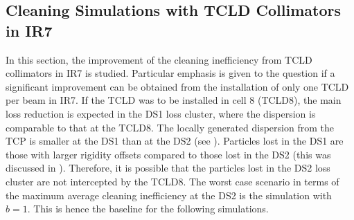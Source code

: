 





\subsection{Cleaning Simulations with TCLD Collimators in IR7}

In this section, the improvement of the cleaning inefficiency from TCLD collimators in IR7 is studied. Particular emphasis is given to the question if a significant improvement can be obtained from the installation of only one TCLD per beam in IR7. If the TCLD was to be installed in cell 8 (TCLD8), the main loss reduction is expected in the DS1 loss cluster, where the dispersion is comparable to that at the TCLD8. The locally generated dispersion from the TCP is smaller at the DS1 than at the DS2 (see ). Particles lost in the DS1 are those with larger rigidity offsets compared to those lost in the DS2 (this was discussed in ). Therefore, it is possible that the particles lost in the DS2 loss cluster are not intercepted by the TCLD8. The worst case scenario in terms of the maximum average cleaning inefficiency at the DS2 is the simulation with $b=1$\mum. This is hence the baseline for the following simulations.



